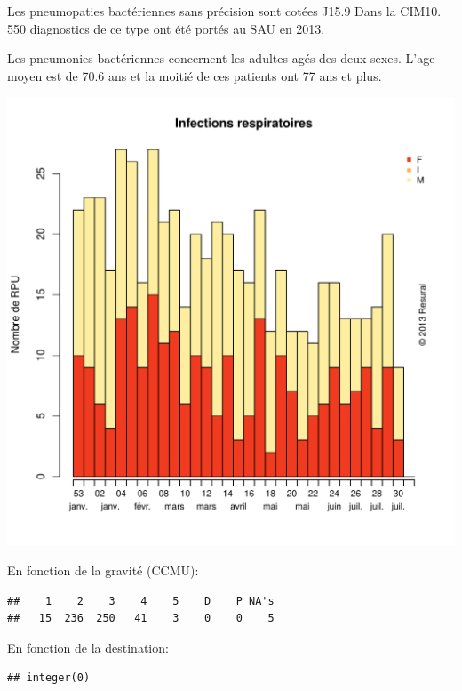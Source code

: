 \documentclass[12pt,english,french,twoside]{report}\usepackage[]{graphicx}\usepackage[]{color}
\makeatletter
\def\maxwidth{ %
  \ifdim\Gin@nat@width>\linewidth
    \linewidth
  \else
    \Gin@nat@width
  \fi
}
\newenvironment{kframe}{%
 \def\at@end@of@kframe{}%
 \ifinner\ifhmode%
  \def\at@end@of@kframe{\end{minipage}}%
  \begin{minipage}{\columnwidth}%
 \fi\fi%
 \def\FrameCommand##1{\hskip\@totalleftmargin \hskip-\fboxsep
 \colorbox{shadecolor}{##1}\hskip-\fboxsep
     \hskip-\linewidth \hskip-\@totalleftmargin \hskip\columnwidth}%
 \MakeFramed {\advance\hsize-\width
   \@totalleftmargin\z@ \linewidth\hsize
   \@setminipage}}%
 {\par\unskip\endMakeFramed%
 \at@end@of@kframe}
\newenvironment{knitrout}{}{} %
\makeatother
\begin{document}
Les pneumopaties bactériennes sans précision sont cotées J15.9 Dans la CIM10.
550 diagnostics de ce type ont été portés au SAU en 2013.

Les pneumonies bactériennes concernent les adultes agés des deux sexes. L'age moyen est de 70.6 ans et la moitié de ces patients ont 77 ans et plus.

\begin{knitrout}
\color{fgcolor}
\includegraphics[width=\maxwidth]{figure/pneumo} 

\end{knitrout}


En fonction de la gravité (CCMU):
\begin{knitrout}
\color{fgcolor}\begin{kframe}
\begin{verbatim}
##    1    2    3    4    5    D    P NA's 
##   15  236  250   41    3    0    0    5
\end{verbatim}
\end{kframe}
\end{knitrout}


En fonction de la destination:
\begin{knitrout}
\color{fgcolor}\begin{kframe}
\begin{verbatim}
## integer(0)
\end{verbatim}
\end{kframe}
\end{knitrout}
\end{document}
